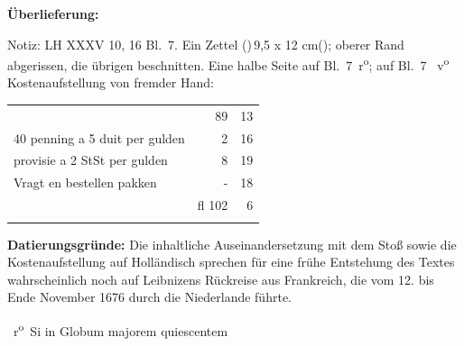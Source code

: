 %  
%
%
%
%   
%
%
%
%
%
%
%
\frenchspacing
%
\begin{ledgroupsized}[r]{120mm}
\footnotesize
\pstart
\noindent\textbf{Überlieferung:}
\pend
\end{ledgroupsized}
%
\begin{ledgroupsized}[r]{114mm}
\footnotesize
\pstart \parindent -6mm
%
Notiz: LH XXXV 10, 16 Bl.~7.
Ein Zettel (\phantom)\hspace*{-1.5mm}\,9,5 x 12 cm\phantom(\hspace*{-1.2mm});
oberer Rand abgerissen, die übrigen beschnitten.
Eine halbe Seite auf Bl.~7~r\textsuperscript{o};
auf Bl.~7~ v\textsuperscript{o} Kostenaufstellung von fremder Hand:
\newline
\protect\begin{tabular}{lrr}
&89&13\\
40 penning a 5 duit per gulden&2&16\\
provisie a 2 StSt per gulden&8&19\\
Vragt en bestellen pakken&-&18\\ \cline{2-3}
&fl 102&6\\
\protect\end{tabular}
\pend
\end{ledgroupsized}
%
%
\vspace{5mm}
\begin{ledgroup}
\footnotesize
\pstart
\noindent%
\textbf{Datierungsgründe:}
Die inhaltliche Auseinandersetzung mit dem Stoß sowie die Kostenaufstellung auf Holländisch sprechen für eine frühe Entstehung des Textes wahrscheinlich noch auf Leibnizens Rückreise aus Frankreich, die vom 12. bis Ende November 1676 durch die Niederlande führte.%
\protect{}%
\protect{}
\pend 
\end{ledgroup}
%
%
\frenchspacing
\count{}%
\count{}%
\count{}
\vspace{8mm}
\pstart%
\normalsize%
\noindent%
~r\textsuperscript{o}\rbrack\
Si in Globum majorem quiescentem%
\protect{}%
\protect{}
%
